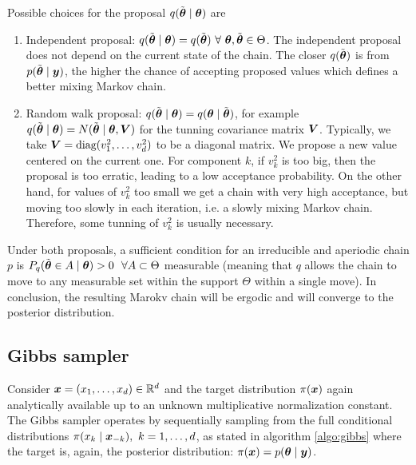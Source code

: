\vspace{2 cm} 

Possible choices for the proposal $q(\tilde{\mbox{\boldmath $\theta$}} \mid \mbox{\boldmath $\theta$})$ are

\begin{enumerate}
\item Independent proposal: $q(\tilde{\mbox{\boldmath $\theta$}} \mid \mbox{\boldmath $\theta$}) = q(\tilde{\mbox{\boldmath $\theta$}}) \ \forall \ \mbox{\boldmath $\theta$}, \tilde{\mbox{\boldmath $\theta$}} \in \Theta$. The independent proposal does not depend on the current state of the chain. The closer $q(\tilde{\mbox{\boldmath $\theta$}})$ is from $p(\tilde{\mbox{\boldmath $\theta$}} \mid \mbox{\boldmath $y$})$, the higher the chance of accepting proposed values which defines a better mixing Markov chain.\\
\item Random walk proposal: $q(\tilde{\mbox{\boldmath $\theta$}} \mid \mbox{\boldmath $\theta$}) = q(\mbox{\boldmath $\theta$} \mid \tilde{\mbox{\boldmath $\theta$}})$, for example $ q(\tilde{\mbox{\boldmath $\theta$}} \mid \mbox{\boldmath $\theta$}) = N(\tilde{\mbox{\boldmath $\theta$}} \mid \mbox{\boldmath $\theta$}, \mbox{\boldmath $V$})$ for the tunning covariance matrix $\mbox{\boldmath $V$}$. Typically, we take $\mbox{\boldmath $V$}=\mbox{diag}(v^2_1, \ldots, v^2_d)$ to be a diagonal matrix. We propose a new value centered on the current one.  For component $k$, if $v^2_k$ is too big, then the proposal is too erratic, leading to a low acceptance probability. On the other hand, for values of $v^2_k$ too small we get a chain with very high acceptance, but moving too slowly in each iteration, i.e. a slowly mixing Markov chain. Therefore, some tunning of $v^2_k$ is usually necessary.
\end{enumerate}

Under both proposals, a sufficient condition for an irreducible and aperiodic chain $p$ is $P_{q}(\tilde{\mbox{\boldmath $\theta$}} \in A \mid \mbox{\boldmath $\theta$}) > 0 \ \ \forall A\subset \Theta$ measurable (meaning that $q$ allows the chain to move to any measurable set within the support $\Theta$ within a single move). In conclusion, the resulting Marokv chain will be ergodic and will converge to the posterior distribution.

\subsection{Gibbs sampler}
\label{sec:gibbs}

Consider $\mbox{\boldmath $x$} = (x_1, \ldots, x_d) \in \mathbb{R}^d$ and the target distribution $\pi(\mbox{\boldmath $x$})$ again analytically available up to an unknown multiplicative normalization constant. The Gibbs sampler operates by sequentially sampling from the full conditional distributions $\pi(x_k \mid \mbox{\boldmath $x$}_{-k}), \ k = 1, \ldots, d$, as stated in algorithm \ref{algo:gibbs} where the target is, again, the posterior distribution: $\pi(\mbox{\boldmath $x$}) = p(\mbox{\boldmath $\theta$} \mid \mbox{\boldmath $y$})$.

